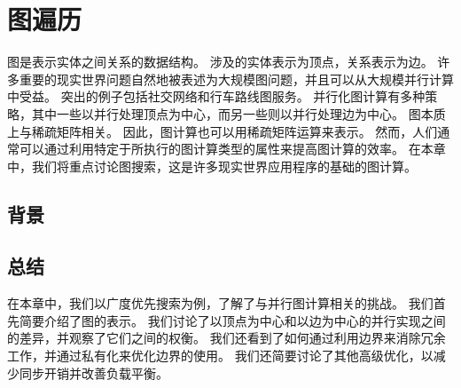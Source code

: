\section{图遍历}
图是表示实体之间关系的数据结构。 涉及的实体表示为顶点，关系表示为边。 许多重要的现实世界问题自然地被表述为大规模图问题，并且可以从大规模并行计算中受益。 突出的例子包括社交网络和行车路线图服务。 并行化图计算有多种策略，其中一些以并行处理顶点为中心，而另一些则以并行处理边为中心。 图本质上与稀疏矩阵相关。 因此，图计算也可以用稀疏矩阵运算来表示。 然而，人们通常可以通过利用特定于所执行的图计算类型的属性来提高图计算的效率。 在本章中，我们将重点讨论图搜索，这是许多现实世界应用程序的基础的图计算。

\subsection{背景}

\subsection{总结}
在本章中，我们以广度优先搜索为例，了解了与并行图计算相关的挑战。 我们首先简要介绍了图的表示。 我们讨论了以顶点为中心和以边为中心的并行实现之间的差异，并观察了它们之间的权衡。 我们还看到了如何通过利用边界来消除冗余工作，并通过私有化来优化边界的使用。 我们还简要讨论了其他高级优化，以减少同步开销并改善负载平衡。